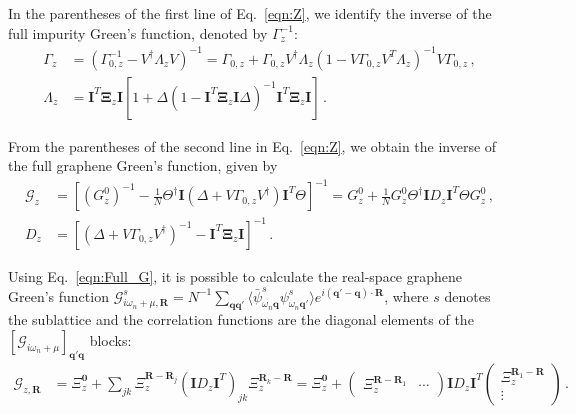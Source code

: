 \documentclass[aps,prb,superscriptaddress,preprint,floatfix]{revtex4-1}
\begin{document}
In the parentheses of the first line of Eq.~\eqref{eqn:Z}, we identify the inverse of the full impurity Green's function, denoted by $\Gamma^{-1}_{z}$:
%
\begin{align}
	\Gamma_{z} & = \left(
    \Gamma^{-1}_{0,z}
    - 
   V^\dagger\Lambda_{z}V
	\right)^{-1}
	=
	\Gamma_{0,z}
	+
	\Gamma_{0,z}
    V^\dagger\Lambda_{z}
	\left(
	1
     - V
    \Gamma_{0,z}
    V^T\Lambda_{z}
	\right)^{-1}V\Gamma_{0,z}
	\,,
    \label{eqn:Gamma}
    \\
    \Lambda_{z} &=
    \mathbf{I}^T\boldsymbol{\Xi}_{z}\mathbf{I}
	\left[1+
    \Delta
	\left( 1
	-
	\mathbf{I}^T\boldsymbol{\Xi}_{z}\mathbf{I}\Delta 
	\right)^{-1} \mathbf{I}^T\boldsymbol{\Xi}_{z}\mathbf{I}
	\right]\,.
	\label{eqn:Lambda}
\end{align}
%

From the parentheses of the second line in Eq.~\eqref{eqn:Z}, we obtain the inverse of the full graphene Green's function, given by
%
\begin{align}
	 \mathcal{G}_{z} & =\left[\left(G_{z}^0\right)^{-1} - \frac{1}{N} \Theta^\dagger\mathbf{I}\left(\Delta + V\Gamma_{0,z}V^\dagger
	 \right)\mathbf{I}^T\Theta
	 \right]^{-1}=
	 G_{z}^0+
	  \frac{1}{N} G_{z}^0\Theta^\dagger\mathbf{I} 
	 D_{z}
	 \mathbf{I}^T\Theta
	 G_{z}^0\,,
	 \label{eqn:Full_G}
	 \\
	 D_{z} &=\left[
	\left(\Delta + V\Gamma_{0,z}V^\dagger
	 \right)^{-1}
	 -
	\mathbf{I}^T
	\boldsymbol{\Xi}_{z} \mathbf{I}
	 \right]^{-1}\,.
	 \label{eqn:D}
\end{align}
%

Using Eq.~\eqref{eqn:Full_G}, it is possible to calculate the real-space graphene Green's function $\mathcal{G}_{i\omega_n + \mu,\mathbf{R}}^s = N^{-1}\sum_{\mathbf{qq}'} \langle \bar{\psi}^s_{\omega_n\mathbf{q}}\psi^s_{\omega_n\mathbf{q}'}\rangle e^{i\left(\mathbf{q}'-\mathbf{q}\right)\cdot\mathbf{R}}$, where $s$ denotes the sublattice and the correlation functions are the diagonal elements of the $\left[\mathcal{G}_{i\omega_n+\mu} \right]_{\mathbf{q}'\mathbf{q}}$ blocks:
%
\begin{align}
	\mathcal{G}_{z,\mathbf{R}} 
	 &=\Xi^\mathbf{0}_{z}
	 +
	\sum_{jk}
	\Xi_{z}^{\mathbf{R} - \mathbf{R}_j}
	  \left(\mathbf{I} 
	 D_{z}
	 \mathbf{I}^T
	 \right)_{jk}
	 \Xi_{z}^{\mathbf{R}_k - \mathbf{R}}
	 =\Xi^\mathbf{0}_{z}
	 +
	 \begin{pmatrix}
	 	\Xi_{z}^{\mathbf{R} - \mathbf{R}_1} & \cdots
	 \end{pmatrix}
	 \mathbf{I} 
	 D_{z}
	 \mathbf{I}^T
	 \begin{pmatrix}
	 	\Xi_{z}^{\mathbf{R}_1 - \mathbf{R}} \\ \vdots
	 \end{pmatrix}\,.
	 \label{eqn:Full_G_Real}
\end{align}
%
\end{document}
